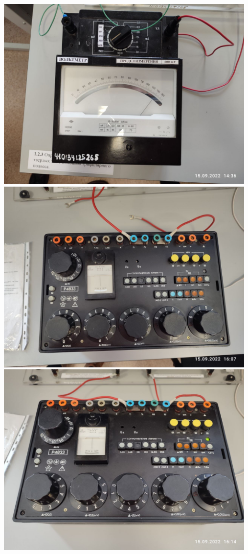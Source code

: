 \documentclass[a4paper, 12pt]{article}
\begin{document}
\includegraphics[width=13cm]{A (6).jpg}\\
\includegraphics[width=13cm]{A (7).jpg}\\
\includegraphics[width=13cm]{A (8).jpg}\\
\end{document}
